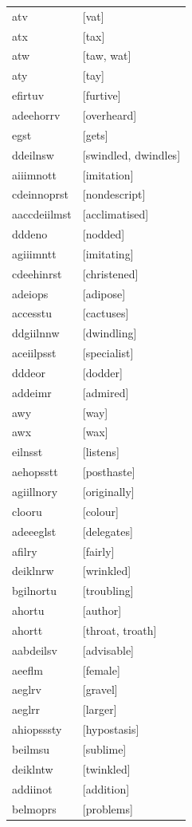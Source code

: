 \documentclass{article}
\begin{document}
\begin{tabular}{ll}
atv & [vat] \\
atx & [tax] \\
atw & [taw, wat] \\
aty & [tay] \\
efirtuv & [furtive] \\
adeehorrv & [overheard] \\
egst & [gets] \\
ddeilnsw & [swindled, dwindles] \\
aiiimnott & [imitation] \\
cdeinnoprst & [nondescript] \\
aaccdeiilmst & [acclimatised] \\
dddeno & [nodded] \\
agiiimntt & [imitating] \\
cdeehinrst & [christened] \\
adeiops & [adipose] \\
accesstu & [cactuses] \\
ddgiilnnw & [dwindling] \\
aceiilpsst & [specialist] \\
dddeor & [dodder] \\
addeimr & [admired] \\
awy & [way] \\
awx & [wax] \\
eilnsst & [listens] \\
aehopsstt & [posthaste] \\
agiillnory & [originally] \\
clooru & [colour] \\
adeeeglst & [delegates] \\
afilry & [fairly] \\
deiklnrw & [wrinkled] \\
bgilnortu & [troubling] \\
ahortu & [author] \\
ahortt & [throat, troath] \\
aabdeilsv & [advisable] \\
aeeflm & [female] \\
aeglrv & [gravel] \\
aeglrr & [larger] \\
ahiopsssty & [hypostasis] \\
beilmsu & [sublime] \\
deiklntw & [twinkled] \\
addiinot & [addition] \\
belmoprs & [problems] \\

\end{tabular}
\end{document}
